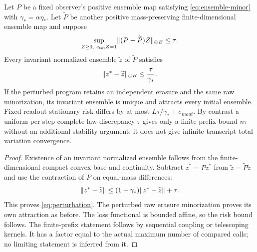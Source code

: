 \begin{proposition}\label{prop:perturbation}
Let $P$ be a fixed observer's positive ensemble map satisfying \eqref{eq:ensemble-minor} with $\gamma_*=\alpha\eta_*$. Let $\widetilde P$ be another positive mass-preserving finite-dimensional ensemble map and suppose
\[
 \sup_{Z\ge0,\ e_{\rm tot}Z=1}\lVert(P-\widetilde P)Z\rVert_{\oplus B}\le\tau.
\]
Every invariant normalized ensemble $\widetilde z$ of $\widetilde P$ satisfies
\begin{equation}\label{eq:perturbation}
 \lVert z^*-\widetilde z\rVert_{\oplus B}\le\frac\tau{\gamma_*}.
\end{equation}
If the perturbed program retains an independent erasure and the same raw minorization, its invariant ensemble is unique and attracts every initial ensemble. Fixed-readout stationary risk differs by at most $L\tau/\gamma_*+e_{
m out}$. By contrast a uniform per-step complete-law discrepancy $\tau$ gives only a finite-prefix bound $n\tau$ without an additional stability argument; it does not give infinite-transcript total variation convergence.
\end{proposition}
\begin{proof}
Existence of an invariant normalized ensemble follows from the finite-dimensional compact convex base and continuity. Subtract $z^*=Pz^*$ from $\widetilde z=\widetilde P\widetilde z$ and use the contraction of $P$ on equal-mass differences:
\[
 \lVert z^*-\widetilde z\rVert\le(1-\gamma_*)\lVert z^*-\widetilde z\rVert+\tau.
\]
This proves \eqref{eq:perturbation}. The perturbed raw erasure minorization proves its own attraction as before. The loss functional is bounded affine, so the risk bound follows. The finite-prefix statement follows by sequential coupling or telescoping kernels. It has a factor equal to the actual maximum number of compared calls; no limiting statement is inferred from it.
\end{proof}

